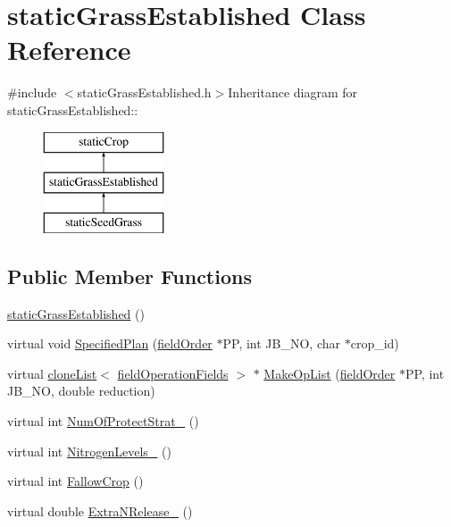 \hypertarget{classstatic_grass_established}{
\section{staticGrassEstablished Class Reference}
\label{classstatic_grass_established}
}


{\ttfamily \#include $<$staticGrassEstablished.h$>$}Inheritance diagram for staticGrassEstablished::\begin{figure}[H]
\begin{center}
\leavevmode
\includegraphics[height=3cm]{classstatic_grass_established}
\end{center}
\end{figure}
\subsection*{Public Member Functions}
\begin{DoxyCompactItemize}
\item 
\hyperlink{classstatic_grass_established_a799a347dd301965b7d1b24be5cf35e44}{staticGrassEstablished} ()
\item 
virtual void \hyperlink{classstatic_grass_established_af5cde9b824bca1b7ffef27ecb92d4b8b}{SpecifiedPlan} (\hyperlink{classfield_order}{fieldOrder} $\ast$PP, int JB\_\-NO, char $\ast$crop\_\-id)
\item 
virtual \hyperlink{classclone_list}{cloneList}$<$ \hyperlink{classfield_operation_fields}{fieldOperationFields} $>$ $\ast$ \hyperlink{classstatic_grass_established_a65912caac93f0e92f34542f28585c5ce}{MakeOpList} (\hyperlink{classfield_order}{fieldOrder} $\ast$PP, int JB\_\-NO, double reduction)
\item 
virtual int \hyperlink{classstatic_grass_established_ac1096e7e84a6224a87d127949c25b163}{NumOfProtectStrat\_\-} ()
\item 
virtual int \hyperlink{classstatic_grass_established_a958b6f586cb695976b5ed8c07ad82459}{NitrogenLevels\_\-} ()
\item 
virtual int \hyperlink{classstatic_grass_established_a40f7a2c745566b2a31813dd597fcdce4}{FallowCrop} ()
\item 
virtual double \hyperlink{classstatic_grass_established_ace876335a825ca2710ab2adfbab12a44}{ExtraNRelease\_\-} ()
\end{DoxyCompactItemize}


